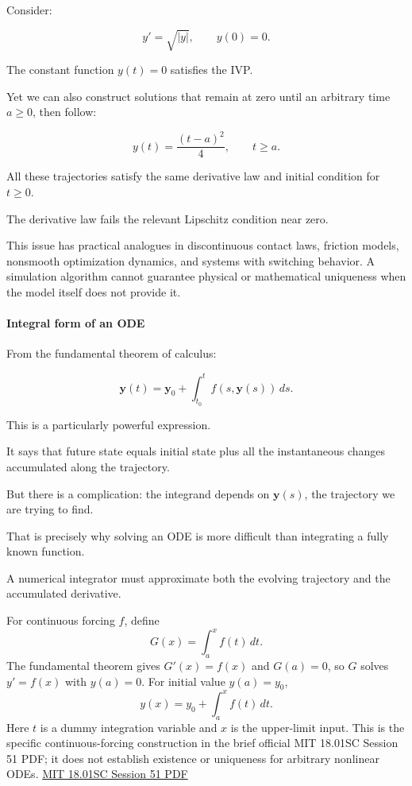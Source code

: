 Consider:

\[
y'=\sqrt{|y|}, \qquad y(0)=0.
\]

The constant function \(y(t)=0\) satisfies the IVP.

Yet we can also construct solutions that remain at zero until an arbitrary time \(a\ge0\), then follow:

\[
y(t)=\frac{(t-a)^2}{4}, \qquad t\ge a.
\]

All these trajectories satisfy the same derivative law and initial condition for \(t\ge0\).

The derivative law fails the relevant Lipschitz condition near zero.

This issue has practical analogues in discontinuous contact laws, friction models, nonsmooth optimization dynamics, and systems with switching behavior. A simulation algorithm cannot guarantee physical or mathematical uniqueness when the model itself does not provide it.

\paragraph{Integral form of an ODE}\label{02-foundations-ii-ch022-integral-form-of-an-ode}

From the fundamental theorem of calculus:

\[
\boxed{ \mathbf y(t) = \mathbf y_0+ \int_{t_0}^{t}f(s,\mathbf y(s))\,ds }.
\]

This is a particularly powerful expression.

It says that future state equals initial state plus all the instantaneous changes accumulated along the trajectory.

But there is a complication: the integrand depends on \(\mathbf y(s)\), the trajectory we are trying to find.

That is precisely why solving an ODE is more difficult than integrating a fully known function.

A numerical integrator must approximate both the evolving trajectory and the accumulated derivative.

For continuous forcing \(f\), define \[
G(x)=\int_a^x f(t)\,dt.
\] The fundamental theorem gives \(G'(x)=f(x)\) and \(G(a)=0\), so \(G\) solves \(y'=f(x)\) with \(y(a)=0\). For initial value \(y(a)=y_0\), \[
y(x)=y_0+\int_a^x f(t)\,dt.
\] Here \(t\) is a dummy integration variable and \(x\) is the upper-limit input. This is the specific continuous-forcing construction in the brief official MIT 18.01SC Session 51 PDF; it does not establish existence or uniqueness for arbitrary nonlinear ODEs. \href{https://ocw.mit.edu/courses/18-01sc-single-variable-calculus-fall-2010/2459faee7ec3308afd5cca2b95fad48e_MIT18_01SCF10_Ses51a.pdf}{MIT 18.01SC Session 51 PDF}

